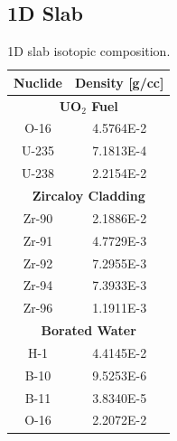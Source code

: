 \subsection{1D Slab}
\label{subsec:chap4-slab}

\begin{table}[h!]
  \centering
  \caption{1D slab isotopic composition.}
  \label{table:chap2-slab-isotopes} 
  \vspace{14pt}
  \begin{tabular}{c c}
  \toprule
  \multicolumn{1}{c}{\bf Nuclide} &
  \multicolumn{1}{c}{\bf Density [g/cc]} \\
  \midrule
  \multicolumn{2}{c}{\bf UO$_2$ Fuel} \\
  \midrule
  O-16 & 4.5764E-2 \\
  U-235 & 7.1813E-4 \\
  U-238 & 2.2154E-2 \\
  \midrule
  \multicolumn{2}{c}{\bf Zircaloy Cladding} \\
  \midrule
  Zr-90 & 2.1886E-2 \\
  Zr-91 & 4.7729E-3 \\
  Zr-92 & 7.2955E-3 \\
  Zr-94 & 7.3933E-3 \\
  Zr-96 & 1.1911E-3 \\
  \midrule
  \multicolumn{2}{c}{\bf Borated Water}  \\
  \midrule
  H-1 & 4.4145E-2 \\
  B-10 & 9.5253E-6 \\
  B-11 & 3.8340E-5 \\
  O-16 & 2.2072E-2 \\
  \bottomrule
\end{tabular}
\end{table}

